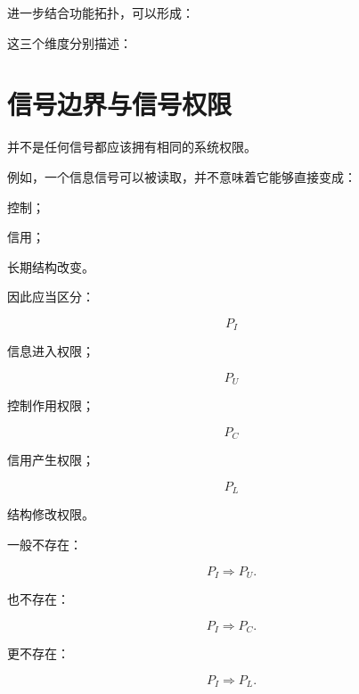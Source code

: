 进一步结合功能拓扑，可以形成：

\begin{statementbox}
\centering
{}
\end{statementbox}

这三个维度分别描述：

\begin{statementbox}
\centering
{}
\end{statementbox}

\begin{statementbox}
\centering
{}
\end{statementbox}

\begin{statementbox}
\centering
{}
\end{statementbox}

\section{信号边界与信号权限}

并不是任何信号都应该拥有相同的系统权限。

例如，一个信息信号可以被读取，并不意味着它能够直接变成：

控制；

信用；

长期结构改变。

因此应当区分：

\[
P_I
\]

信息进入权限；

\[
P_U
\]

控制作用权限；

\[
P_C
\]

信用产生权限；

\[
P_L
\]

结构修改权限。

一般不存在：

\[
P_I
\Rightarrow
P_U.
\]

也不存在：

\[
P_I
\Rightarrow
P_C.
\]

更不存在：

\[
P_I
\Rightarrow
P_L.
\]

